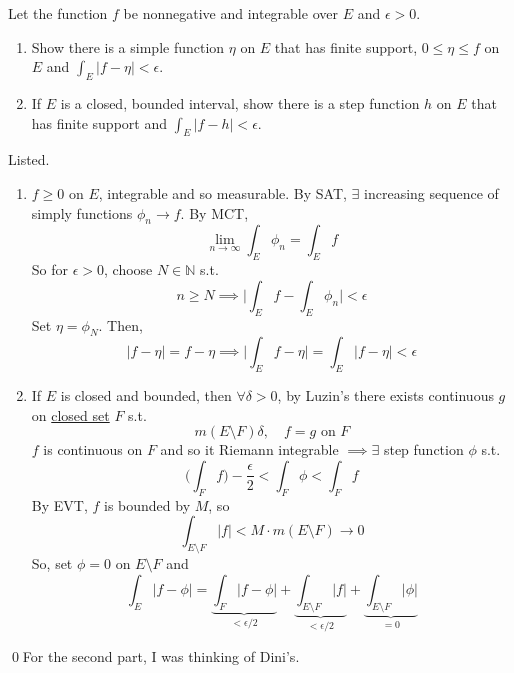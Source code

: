   \begin{exercise}[Royden 4.21]
    Let the function $f$ be nonnegative and integrable over $E$ and $\epsilon > 0$. 
    \begin{enumerate}
      \item Show there is a simple function $\eta$ on $E$ that has finite support, $0 \leq \eta \leq f$ on $E$ and $\int_E |f - \eta| < \epsilon$. 
      \item If $E$ is a closed, bounded interval, show there is a step function $h$ on $E$ that has finite support and $\int_E |f - h| < \epsilon$.
    \end{enumerate}
  \end{exercise}
  \begin{solution}
    Listed. 
    \begin{enumerate}
      \item $f \geq 0$ on $E$, integrable and so measurable. By SAT, $\exists$ increasing sequence of simply functions $\phi_n \to f$. By MCT, 
        \begin{equation}
          \lim_{n \to \infty} \int_E \phi_n = \int_E f
        \end{equation}
        So for $\epsilon > 0$, choose $N \in \mathbb{N}$ s.t. 
        \begin{equation}
          n \geq N \implies \bigg| \int_E f - \int_E \phi_n \bigg| < \epsilon
        \end{equation}
        Set $\eta = \phi_N$. Then, 
        \begin{equation}
          |f - \eta| = f - \eta \implies \bigg| \int_E f - \eta \bigg| = \int_E |f - \eta| < \epsilon 
        \end{equation}

      \item If $E$ is closed and bounded, then $\forall \delta > 0$, by Luzin's there exists continuous $g$ on \hyperref[pst-def:closed]{closed set} $F$ s.t. 
        \begin{equation}
          m(E \setminus F) \delta, \quad f = g \text{ on } F
        \end{equation}
        $f$ is continuous on $F$ and so it Riemann integrable $\implies \exists$ step function $\phi$ s.t. 
        \begin{equation}
          \bigg( \int_F f \bigg) - \frac{\epsilon}{2} < \int_F \phi < \int_F f
        \end{equation}
        By EVT, $f$ is bounded by $M$, so 
        \begin{equation}
          \int_{E \setminus F} |f| < M \cdot m(E \setminus F) \to 0
        \end{equation}
        So, set $\phi = 0$ on $E \setminus F$ and 
        \begin{equation}
          \int_E |f - \phi| = \underbrace{\int_F |f - \phi|}_{<\epsilon/2} + \underbrace{\int_{E \setminus F} |f|}_{< \epsilon/2} + \underbrace{\int_{E \setminus F} |\phi|}_{=0}
        \end{equation}
    \end{enumerate}
    \qed For the second part, I was thinking of Dini's. 
  \end{solution}

